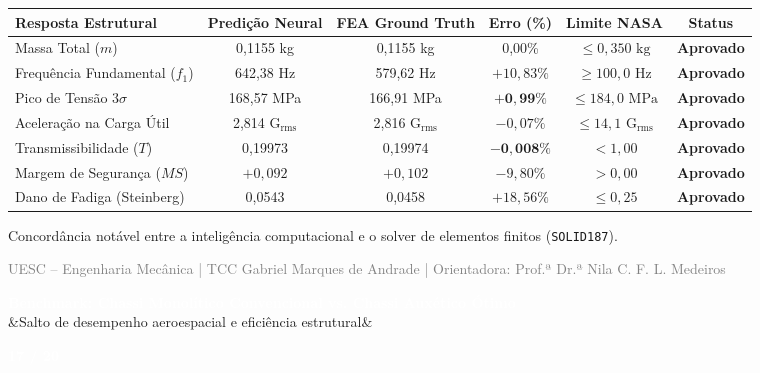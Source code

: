\documentclass[11pt]{article}
\newcommand{\slideheader}[3]{
    \noindent
    \begin{minipage}{\textwidth}
        \colorbox{SpaceNavy}{
            \parbox{\dimexpr\textwidth-2\fboxsep\relax}{
                \vspace{0.2cm}
                \hspace{0.3cm}
                \begin{minipage}{0.85\textwidth}
                    {\Large \textbf{\textcolor{white}{#1}}}\\[0.1cm]
                    \ifx&#2&\else{\small \textbf{\textcolor{SpaceGold}{#2}}}\fi
                \end{minipage}
                \hfill
                \begin{minipage}{0.10\textwidth}
                    \raggedleft
                    {\large \textbf{\textcolor{white}{#3 / 20}}}\hspace{0.3cm}
                \end{minipage}
                \vspace{0.2cm}
            }
        }
    \end{minipage}
    \vspace{0.4cm}
}
\newcommand{\slidefooter}{
    \vfill
    \noindent
    \begin{minipage}{\textwidth}
        \centering
        \scriptsize \textcolor{gray}{UESC -- Engenharia Mecânica | TCC Gabriel Marques de Andrade | Orientadora: Prof.ª Dr.ª Nila C. F. L. Medeiros}
    \end{minipage}
}
\begin{document}
\centering
\small
\begin{tabular}{lccccc}
\toprule
\textbf{Resposta Estrutural} & \textbf{Predição Neural} & \textbf{FEA Ground Truth} & \textbf{Erro (\%)} & \textbf{Limite NASA} & \textbf{Status} \\
\midrule
Massa Total ($m$) & 0,1155 kg & 0,1155 kg & 0,00\% & $\le 0{,}350\text{ kg}$ & \textcolor{ApprovedGreen}{\textbf{Aprovado}} \\
Frequência Fundamental ($f_1$) & 642,38 Hz & 579,62 Hz & $+10{,}83\%$ & $\ge 100{,}0\text{ Hz}$ & \textcolor{ApprovedGreen}{\textbf{Aprovado}} \\
Pico de Tensão $3\sigma$ & 168,57 MPa & 166,91 MPa & $\mathbf{+0{,}99\%}$ & $\le 184{,}0\text{ MPa}$ & \textcolor{ApprovedGreen}{\textbf{Aprovado}} \\
Aceleração na Carga Útil & 2,814 G$_{\text{rms}}$ & 2,816 G$_{\text{rms}}$ & $-0{,}07\%$ & $\le 14{,}1\text{ G}_{\text{rms}}$ & \textcolor{ApprovedGreen}{\textbf{Aprovado}} \\
Transmissibilidade ($T$) & 0,19973 & 0,19974 & $\mathbf{-0{,}008\%}$ & $< 1{,}00$ & \textcolor{ApprovedGreen}{\textbf{Aprovado}} \\
Margem de Segurança ($MS$) & $+0{,}092$ & $+0{,}102$ & $-9{,}80\%$ & $> 0{,}00$ & \textcolor{ApprovedGreen}{\textbf{Aprovado}} \\
Dano de Fadiga (Steinberg) & 0,0543 & 0,0458 & $+18{,}56\%$ & $\le 0{,}25$ & \textcolor{ApprovedGreen}{\textbf{Aprovado}} \\
\bottomrule
\end{tabular}

\vspace{0.3cm}
\footnotesize
Concordância notável entre a inteligência computacional e o solver de elementos finitos (\texttt{SOLID187}).

\slidefooter
\clearpage

\slideheader{Benchmark: Chassi Monolítico Convencional vs. Chassi Auxético Ótimo}{Salto de desempenho aeroespacial e eficiência estrutural}{17}
\end{document}
